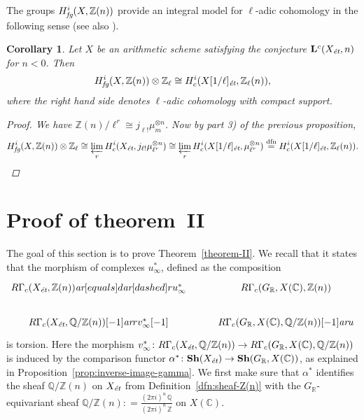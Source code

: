 \documentclass[leqno,12pt]{article}
\theoremstyle{plain}
\newtheorem{corollary}[theorem]{\indent\sc Corollary}
\theoremstyle{definition}
\newcommand{\CC}{\mathbb{C}}
\newcommand{\QQ}{\mathbb{Q}}
\newcommand{\RR}{\mathbb{R}}
\newcommand{\ZZ}{\mathbb{Z}}
\newcommand{\dfn}{\mathrel{\mathop:}=}
\newcommand{\ar}{\text{\it ar}}
\newcommand{\et}{\text{\it \'{e}t}}
\newcommand{\fg}{\text{\it fg}}
\begin{document}
The groups $H_\fg^i (X, \ZZ (n))$ provide an integral model for $\ell$-adic
cohomology in the following sense (see also \cite[\S 8]{Geisser-2004}).

\begin{corollary}
  \label{cor:RGamma-fg-model-for-l-adic-cohomology}
  Let $X$ be an arithmetic scheme satisfying the conjecture
  $\mathbf{L}^c (X_\et, n)$ for $n < 0$. Then
  $$H_\fg^i (X, \ZZ (n)) \otimes \ZZ_\ell \cong H^i_c (X [1/\ell]_\et, \ZZ_\ell (n)),$$
  where the right hand side denotes $\ell$-adic cohomology with compact support.

  \begin{proof}
    We have $\ZZ (n)/\ell^r \cong j_{\ell!} \mu_m^{\otimes n}$.
    Now by part 3) of the previous proposition,
    \[ H_\fg^i (X, \ZZ (n)) \otimes \ZZ_\ell \cong
      \varprojlim_r H_c^i (X_\et, j_{\ell!} \mu_{\ell^r}^{\otimes n}) \cong
      \varprojlim_r H_c^i (X [1/\ell]_\et, \mu_{\ell^r}^{\otimes n})
      \stackrel{\text{dfn}}{=} H_c^i (X [1/\ell]_\et, \ZZ_\ell (n)). \qedhere \]
  \end{proof}
\end{corollary}


\section{Proof of theorem~II}
\label{sec:theorem-II}

The goal of this section is to prove Theorem~\ref{theorem-II}. We recall that it
states that the morphism of complexes $u_\infty^*$, defined as the composition
\[ \begin{tikzcd}
  R\Gamma_c (X_\et, \ZZ(n)) \ar[equals]{d}\ar[dashed]{r}{u_\infty^*} & R\Gamma_c (G_\RR, X (\CC), \ZZ (n)) \\
  R\Gamma_c (X_\et, \QQ/\ZZ (n)) [-1] \ar{r}{v_\infty^* [-1]} & R\Gamma_c (G_\RR, X (\CC), \QQ/\ZZ (n)) [-1] \ar{u}
\end{tikzcd} \]
is torsion. Here the morphism
$v_\infty^*\colon R\Gamma_c (X_\et, \QQ/\ZZ (n)) \to R\Gamma_c (G_\RR, X (\CC), \QQ/\ZZ (n))$
is induced by the comparison functor
$\alpha^*\colon \mathbf{Sh} (X_\et) \to \mathbf{Sh} (G_\RR, X (\CC))$, as
explained in Proposition~\ref{prop:inverse-image-gamma}. We first make sure that
$\alpha^*$ identifies the sheaf $\QQ/\ZZ (n)$ on $X_\et$ from
Definition~\ref{dfn:sheaf-Z(n)} with the $G_\RR$-equivariant sheaf
$\QQ/\ZZ (n) \dfn \frac{(2\pi i)^n\,\QQ}{(2\pi i)^n\,\ZZ}$ on $X (\CC)$.
\end{document}
